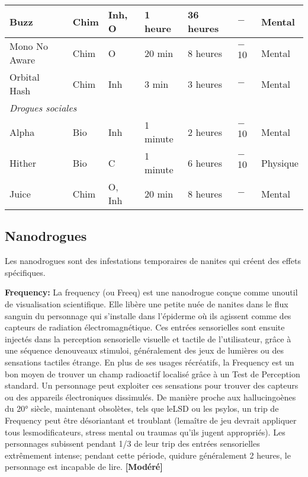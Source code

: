 \begin{table}
\begin{tabularx}{\textwidth}{|X|l|l|l|l|X|X|}
Buzz	&Chim	&Inh, O	&1 heure	&36 heures	&$-$	&Mental	\\ \hline

Mono No Aware	&Chim	&O	&20 min	&8 heures	&$-$10	&Mental	\\ \hline

Orbital Hash	&Chim	&Inh	&3 min	&3 heures	&$-$	&Mental	\\ \hline

\multicolumn{7}{|l|}{\emph{Drogues sociales}}	\\ \hline

Alpha	&Bio	&Inh	&1 minute	&2 heures	&$-$10	&Mental	\\ \hline

Hither	&Bio	&C	&1 minute	&6 heures	&$-$10	&Physique	\\ \hline

Juice	&Chim	&O, Inh	&20 min	&8 heures	&$-$	&Mental	\\ \hline

\end{tabularx} \end{table} 

\clearpage



\label{tab:drugs} 



\subsection{Nanodrogues} \label{sec:nanodrugs} 

Les nanodrogues sont des infestations temporaires de nanites qui créent des effets spécifiques. 

\textbf{Frequency:} La frequency (ou Freeq) est une nanodrogue conçue comme unoutil de visualisation scientifique. Elle libère une petite nuée de nanites dans le flux sanguin du personnage qui s'installe dans l'épiderme où ils agissent comme des capteurs de radiation électromagnétique. Ces entrées sensorielles sont ensuite injectés dans la perception sensorielle visuelle et tactile de l'utilisateur, grâce à une séquence denouveaux stimuloi, généralement des jeux de lumières ou des sensations tactiles étrange. En plus de ses usages récréatifs, la Frequency est un bon moyen de trouver un champ radioactif localisé grâce à un Test de Perception standard. Un personnage peut exploiter ces sensations pour trouver des capteurs ou des appareils électroniques dissimulés. De manière proche aux hallucingoènes du 20° siècle, maintenant obsolètes, tels que leLSD ou les psylos, un trip de Frequency peut être désoriantant et troublant (lemaître de jeu devrait appliquer tous lesmodificateurs, stress mental ou traumas qu'ils jugent appropriés). Les personnages subissent pendant 1/3 de leur trip des entrées sensorielles extrêmement intense; pendant cette période, quidure généralement 2 heures, le personnage est incapable de lire. \textbf{[Modéré]} 

